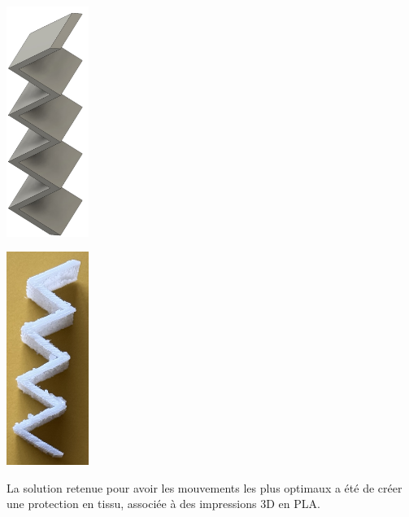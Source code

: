 \begin{minipage}[c]{0.48\textwidth}
    \begin{center}
        \includegraphics[width=0.2\textwidth]{assets/figures/Protections_laser/Securite_mecanique/Protection_vers_microscope/zigzag_model.jpeg}
    \end{center}
    \label{zigzag_model}
\end{minipage}\hfill
\begin{minipage}[c]{0.48\textwidth}
    \begin{center}
        \includegraphics[width=0.2\textwidth]{assets/figures/Protections_laser/Securite_mecanique/Protection_vers_microscope/zigzag_reel.jpeg}
    \end{center}
    \label{zigzag_reel}
\end{minipage}

La solution retenue pour avoir les mouvements les plus optimaux a été de créer une protection en tissu, associée à des impressions 3D en PLA.

